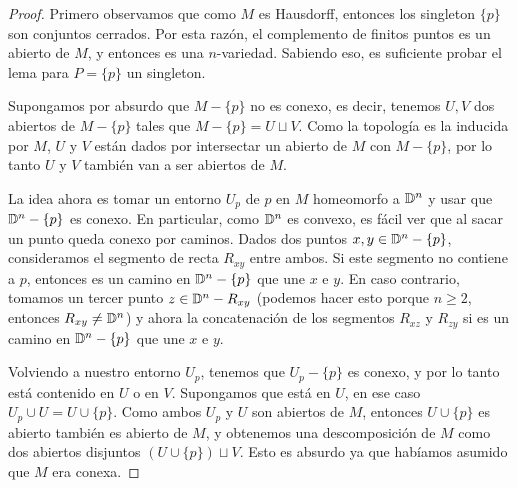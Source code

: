\begin{proof}

    Primero observamos que como $M$ es Hausdorff, entonces los singleton $\{p\}$ son conjuntos cerrados. Por esta razón, el complemento de finitos puntos es un abierto de $M$, y entonces es una $n$-variedad. Sabiendo eso, es suficiente probar el lema para $P=\{p\}$ un singleton. 

    Supongamos por absurdo que $M-\{p\}$ no es conexo, es decir, tenemos $U, V$ dos abiertos de $M-\{p\}$ tales que $M-\{p\}=U\sqcup V$. Como la topología es la inducida por $M$, $U$ y $V$ están dados por intersectar un abierto de $M$ con $M-\{p\}$, por lo tanto $U$ y $V$ también van a ser abiertos de $M$.

    La idea ahora es tomar un entorno $U_p$ de $p$ en $M$ homeomorfo a $\mathbb{D}^n$ y usar que $\mathbb{D}^n -\{p\}$ es conexo. En particular, como $\mathbb{D}^n$ es convexo, es fácil ver que al sacar un punto queda conexo por caminos. Dados dos puntos $x,y\in\mathbb{D}^n-\{p\}$, consideramos el segmento de recta $R_{xy}$ entre ambos. Si este segmento no contiene a $p$, entonces es un camino en $\mathbb{D}^n-\{p\}$ que une $x$ e $y$. En caso contrario, tomamos un tercer punto $z\in\mathbb{D}^n-R_{xy}$ (podemos hacer esto porque $n\geq 2$, entonces $R_{xy}\neq \mathbb{D}^n$) y ahora la concatenación de los segmentos $R_{xz}$ y $R_{zy}$ si es un camino en $\mathbb{D}^n-\{p\}$ que une $x$ e $y$. 


    Volviendo a nuestro entorno $U_p$, tenemos que $U_p - \{p\}$ es conexo, y por lo tanto está contenido en $U$ o en $V$. Supongamos que está en $U$, en ese caso $U_p\cup U = U\cup\{p\}$. Como ambos $U_p$ y $U$ son abiertos de $M$, entonces $U\cup \{p\}$ es abierto también es abierto de $M$, y obtenemos una descomposición de $M$ como dos abiertos disjuntos $(U\cup\{p\})\sqcup V$. Esto es absurdo ya que habíamos asumido que $M$ era conexa.
\end{proof}





